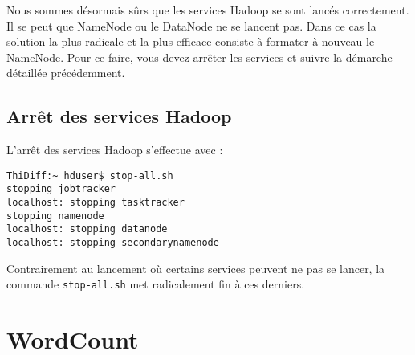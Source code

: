 \par Nous sommes désormais sûrs que les services Hadoop se sont lancés correctement. Il se peut que NameNode ou le DataNode ne se lancent pas. Dans ce cas la solution la plus radicale et la plus efficace consiste à formater à nouveau le NameNode. Pour ce faire, vous devez arrêter les services et suivre la démarche détaillée précédemment.

\subsection{Arrêt des services Hadoop}
\label{sec:arret-service-hadoop}

\par L'arrêt des services Hadoop s'effectue avec :

\begin{verbatim}
ThiDiff:~ hduser$ stop-all.sh
stopping jobtracker
localhost: stopping tasktracker
stopping namenode
localhost: stopping datanode
localhost: stopping secondarynamenode
\end{verbatim}

\par Contrairement au lancement où certains services peuvent ne pas se lancer, la commande \texttt{stop-all.sh} met radicalement fin à ces derniers.

\section{WordCount}
\label{sec:ex-wordcount}

